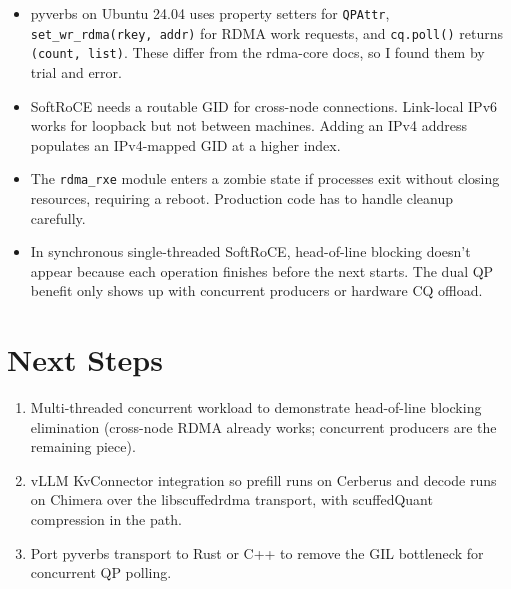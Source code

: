 \documentclass[11pt]{article}
\begin{document}
\begin{itemize}
\item pyverbs on Ubuntu 24.04 uses property setters for \texttt{QPAttr}, \texttt{set\_wr\_rdma(rkey, addr)} for RDMA work requests, and \texttt{cq.poll()} returns \texttt{(count, list)}. These differ from the rdma-core docs, so I found them by trial and error.
\item SoftRoCE needs a routable GID for cross-node connections. Link-local IPv6 works for loopback but not between machines. Adding an IPv4 address populates an IPv4-mapped GID at a higher index.
\item The \texttt{rdma\_rxe} module enters a zombie state if processes exit without closing resources, requiring a reboot. Production code has to handle cleanup carefully.
\item In synchronous single-threaded SoftRoCE, head-of-line blocking doesn't appear because each operation finishes before the next starts. The dual QP benefit only shows up with concurrent producers or hardware CQ offload.
\end{itemize}

\section{Next Steps}

\begin{enumerate}
\item Multi-threaded concurrent workload to demonstrate head-of-line blocking elimination (cross-node RDMA already works; concurrent producers are the remaining piece).
\item vLLM KvConnector integration so prefill runs on Cerberus and decode runs on Chimera over the libscuffedrdma transport, with scuffedQuant compression in the path.
\item Port pyverbs transport to Rust or C++ to remove the GIL bottleneck for concurrent QP polling.
\end{enumerate}
\end{document}
